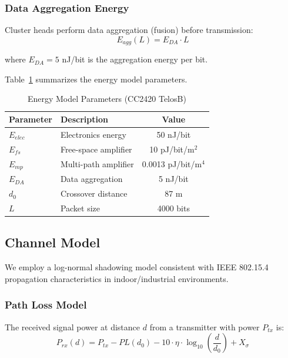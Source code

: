 \subsubsection{Data Aggregation Energy}

Cluster heads perform data aggregation (fusion) before transmission:
\begin{equation}
E_{agg}(L) = E_{DA} \cdot L
\label{eq:agg_energy}
\end{equation}

where $E_{DA} = 5$ nJ/bit is the aggregation energy per bit.

Table~\ref{tab:energy_params} summarizes the energy model parameters.

\begin{table}[htbp]
\centering
\caption{Energy Model Parameters (CC2420 TelosB)}
\label{tab:energy_params}
\begin{tabular}{@{}llc@{}}
\toprule
Parameter & Description & Value \\
\midrule
$E_{elec}$ & Electronics energy & 50 nJ/bit \\
$E_{fs}$ & Free-space amplifier & 10 pJ/bit/m$^2$ \\
$E_{mp}$ & Multi-path amplifier & 0.0013 pJ/bit/m$^4$ \\
$E_{DA}$ & Data aggregation & 5 nJ/bit \\
$d_0$ & Crossover distance & 87 m \\
$L$ & Packet size & 4000 bits \\
\bottomrule
\end{tabular}
\end{table}

\subsection{Channel Model}

We employ a log-normal shadowing model consistent with IEEE 802.15.4
propagation characteristics in indoor/industrial environments.

\subsubsection{Path Loss Model}

The received signal power at distance $d$ from a transmitter with power
$P_{tx}$ is:
\begin{equation}
P_{rx}(d) = P_{tx} - PL(d_0) - 10 \cdot \eta \cdot \log_{10}\left(\frac{d}{d_0}\right) + X_\sigma
\label{eq:path_loss}
\end{equation}

